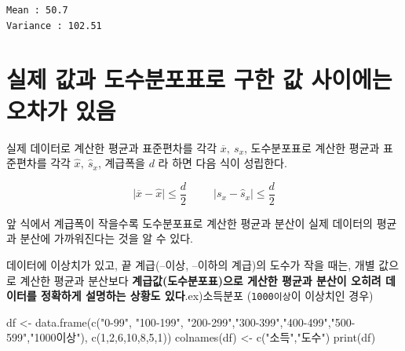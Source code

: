 \documentclass[
  letterpaper,
  DIV=11,
  numbers=noendperiod]{scrreprt}
\newenvironment{Shaded}{\begin{snugshade}}{\end{snugshade}}
\newcommand{\DecValTok}[1]{\textcolor[rgb]{0.68,0.00,0.00}{#1}}
\newcommand{\FunctionTok}[1]{\textcolor[rgb]{0.28,0.35,0.67}{#1}}
\newcommand{\NormalTok}[1]{\textcolor[rgb]{0.00,0.23,0.31}{#1}}
\newcommand{\OtherTok}[1]{\textcolor[rgb]{0.00,0.23,0.31}{#1}}
\newcommand{\StringTok}[1]{\textcolor[rgb]{0.13,0.47,0.30}{#1}}
\begin{document}
\begin{verbatim}
Mean : 50.7
Variance : 102.51
\end{verbatim}

\hypertarget{uxc2e4uxc81c-uxac12uxacfc-uxb3c4uxc218uxbd84uxd3ecuxd45cuxb85c-uxad6cuxd55c-uxac12-uxc0acuxc774uxc5d0uxb294-uxc624uxcc28uxac00-uxc788uxc74c}{%
\section{실제 값과 도수분포표로 구한 값 사이에는 오차가
있음}\label{uxc2e4uxc81c-uxac12uxacfc-uxb3c4uxc218uxbd84uxd3ecuxd45cuxb85c-uxad6cuxd55c-uxac12-uxc0acuxc774uxc5d0uxb294-uxc624uxcc28uxac00-uxc788uxc74c}}

실제 데이터로 계산한 평균과 표준편차를 각각 \(\overline{x},\ s_x\),
도수분포표로 계산한 평균과 표준편차를 각각 \(\hat{x},\ \hat{s}_x\),
계급폭을 \(d\) 라 하면 다음 식이 성립한다.

\[\lvert\overline{x}-\hat{x}\rvert \leq \frac{d}{2}\ \ \ \ \ \ \ \ \ \ \ \lvert s_x-\hat{s}_x\rvert \leq \frac{d}{2}\]

앞 식에서 계급폭이 작을수록 도수분포표로 계산한 평균과 분산이 실제
데이터의 평균과 분산에 가까워진다는 것을 알 수 있다.

데이터에 이상치가 있고, 끝 계급(--이상, --이하의 계급)의 도수가 작을
때는, 개별 값으로 계산한 평균과 분산보다 \textbf{계급값(도수분포표)으로
게산한 평균과 분산이 오히려 데이터를 정확하게 설명하는 상황도
있다}.ex)소득분포 (\texttt{1000이상}이 이상치인 경우)

\begin{Shaded}
\begin{Highlighting}[]
\NormalTok{df }\OtherTok{\textless{}{-}} \FunctionTok{data.frame}\NormalTok{(}\FunctionTok{c}\NormalTok{(}\StringTok{"0{-}99"}\NormalTok{, }\StringTok{"100{-}199"}\NormalTok{, }\StringTok{"200{-}299"}\NormalTok{,}\StringTok{"300{-}399"}\NormalTok{,}\StringTok{"400{-}499"}\NormalTok{,}\StringTok{"500{-}599"}\NormalTok{,}\StringTok{"1000이상"}\NormalTok{),}
           \FunctionTok{c}\NormalTok{(}\DecValTok{1}\NormalTok{,}\DecValTok{2}\NormalTok{,}\DecValTok{6}\NormalTok{,}\DecValTok{10}\NormalTok{,}\DecValTok{8}\NormalTok{,}\DecValTok{5}\NormalTok{,}\DecValTok{1}\NormalTok{))}
\FunctionTok{colnames}\NormalTok{(df) }\OtherTok{\textless{}{-}} \FunctionTok{c}\NormalTok{(}\StringTok{"소득"}\NormalTok{,}\StringTok{"도수"}\NormalTok{)}
\FunctionTok{print}\NormalTok{(df)}
\end{Highlighting}
\end{Shaded}
\end{document}
